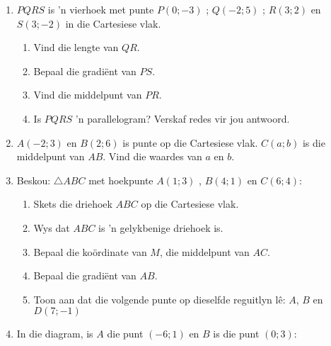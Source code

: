 \begin{eocexercises}{}
\begin{enumerate}[noitemsep, label=\textbf{\arabic*}. ]
\item $PQRS$ is ’n vierhoek met punte $P(0;-3)$ ; $Q(-2;5)$ ; $R(3;2)$ en $S(3;-2)$  in die Cartesiese vlak.
\begin{enumerate}[noitemsep, label=\textbf{(\alph*)} ]
\item Vind die lengte van $QR$.
\item Bepaal die gradiënt van $PS$.
\item Vind die middelpunt van $PR$.
\item Is $PQRS$  ’n parallelogram? Verskaf redes vir jou antwoord.
 \end{enumerate}
\item $A(-2;3)$ en $B(2;6)$ is punte op die Cartesiese vlak. $C(a;b)$ is die middelpunt van $AB$. Vind die waardes
van $a$ en $b$.
\item Beskou: $\triangle ABC$ met hoekpunte $A(1; 3)$ , $B(4;1)$ en $C (6; 4)$:
\begin{enumerate}[noitemsep, label=\textbf{(\alph*)} ]
\item Skets die driehoek $ABC$ op die Cartesiese vlak. 
\item Wys dat $ABC$ is ’n gelykbenige driehoek is.
\item Bepaal die koördinate van $M$, die middelpunt van $AC$.
\item Bepaal die gradiënt van $AB$.
\item Toon aan dat die volgende punte op dieselfde reguitlyn l\^e: $A$, $B$ en $D(7;-1)$
\end{enumerate}
\item In die diagram, is $A$ die punt $(-6;1)$ en $B$ is die punt $(0;3)$:
    \setcounter{subfigure}{0}
    \begin{figure}[H] %
      \begin{center}
\end{center}
\end{figure}
\end{enumerate}
\end{eocexercises}
